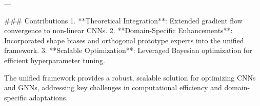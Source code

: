 ---

### Contributions  
1. **Theoretical Integration**: Extended gradient flow convergence to non-linear CNNs.  
2. **Domain-Specific Enhancements**: Incorporated shape biases and orthogonal prototype experts into the unified framework.  
3. **Scalable Optimization**: Leveraged Bayesian optimization for efficient hyperparameter tuning.  

The unified framework provides a robust, scalable solution for optimizing CNNs and GNNs, addressing key challenges in computational efficiency and domain-specific adaptations.